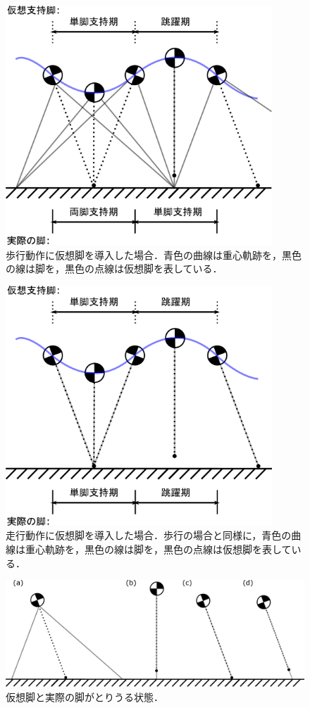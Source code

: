 \begin{figure}[htbp]
 \centering
 \includegraphics[width = 10.0cm, clip]{./fig/walking_with_vsl.png}
 \caption{歩行動作に仮想脚を導入した場合．青色の曲線は重心軌跡を，黒色の線は脚を，黒色の点線は仮想脚を表している．\label{w_vsl}}
\end{figure}
\begin{figure}
 \centering
 \includegraphics[width = 10.0cm,clip]{./fig/running_with_vsl.png}
 \caption{走行動作に仮想脚を導入した場合．歩行の場合と同様に，青色の曲線は重心軌跡を，黒色の線は脚を，黒色の点線は仮想脚を表している．\label{r_vsl}}
\end{figure}

\begin{figure}[htbp]
 \centering
 \includegraphics[clip,width=12.0cm]{./fig/vsl_pattern.png}
    \caption{仮想脚と実際の脚がとりうる状態．\label{compare}}
\end{figure}

